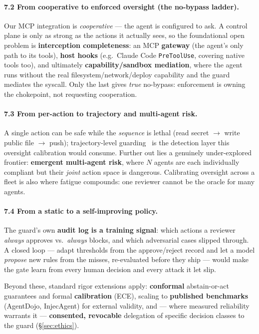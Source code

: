 \documentclass[11pt]{article}
\begin{document}
\paragraph{7.2 From cooperative to enforced oversight (the no-bypass ladder).} Our MCP integration is
\emph{cooperative} --- the agent is configured to ask. A control plane is only as strong as the
actions it actually sees, so the foundational open problem is \textbf{interception completeness}: an
MCP \textbf{gateway} (the agent's only path to its tools), \textbf{host hooks} (e.g.\ Claude Code
\texttt{PreToolUse}, covering native tools too), and ultimately \textbf{capability/sandbox mediation},
where the agent runs without the real filesystem/network/deploy capability and the guard mediates the
syscall. Only the last gives \emph{true} no-bypass: enforcement is owning the chokepoint, not
requesting cooperation.

\paragraph{7.3 From per-action to trajectory and multi-agent risk.} A single action can be safe while
the \emph{sequence} is lethal (read secret $\rightarrow$ write public file $\rightarrow$ push);
trajectory-level guarding~\cite{traj-guard,shieldagent} is the detection layer this oversight
calibration would consume. Further out lies a genuinely under-explored frontier: \textbf{emergent
multi-agent risk}, where $N$ agents are each individually compliant but their \emph{joint} action
space is dangerous. Calibrating oversight across a fleet is also where fatigue compounds: one
reviewer cannot be the oracle for many agents.

\paragraph{7.4 From a static to a self-improving policy.} The guard's own \textbf{audit log is a
training signal}: which actions a reviewer \emph{always} approves vs.\ \emph{always} blocks, and which
adversarial cases slipped through. A closed loop --- adapt thresholds from the approve/reject record
and let a model \emph{propose} new rules from the misses, re-evaluated before they ship --- would make
the gate learn from every human decision and every attack it let slip.

Beyond these, standard rigor extensions apply: \textbf{conformal} abstain-or-act guarantees and formal
\textbf{calibration} (ECE), scaling to \textbf{published benchmarks} (AgentDojo, InjecAgent) for
external validity, and --- where measured reliability warrants it --- \textbf{consented, revocable}
delegation of specific decision classes to the guard (\S\ref{sec:ethics}).
\end{document}
